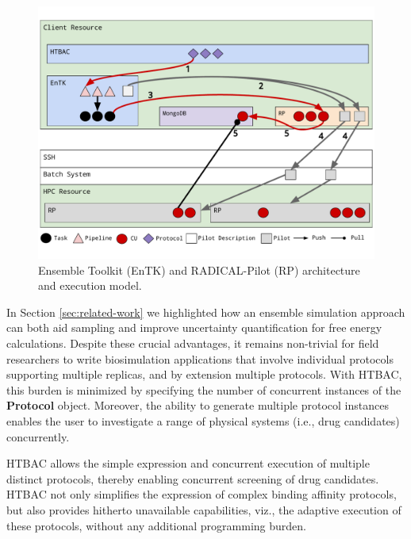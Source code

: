 \begin{figure}
  \centering
   \includegraphics[width=\columnwidth]{figures/ht-bac-rp_integration.pdf}
  \caption{Ensemble Toolkit (EnTK) and RADICAL-Pilot (RP) architecture and 
  execution model.}
\label{fig:integration}
\end{figure}



In Section \ref{sec:related-work} we highlighted how an ensemble
simulation approach can both aid sampling and improve uncertainty
quantification for free energy calculations. Despite these crucial advantages,
it remains non-trivial for field researchers to write biosimulation
applications that involve individual protocols supporting multiple replicas,
and by extension multiple protocols. With HTBAC, this burden is minimized by
specifying the number of concurrent instances of the \textbf{Protocol} object.
Moreover, the ability to generate multiple protocol instances enables the user
to investigate a range of physical systems (i.e., drug candidates)
concurrently.

HTBAC allows the simple expression and concurrent execution of multiple
distinct protocols, thereby enabling concurrent screening of drug candidates.
HTBAC not only simplifies the expression of complex binding affinity
protocols, but also provides hitherto unavailable capabilities, viz., the
adaptive execution of these protocols, without any additional programming
burden. 


